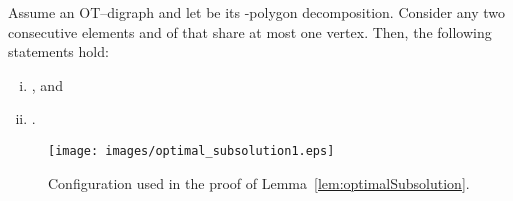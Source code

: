 \documentclass{myllncs-mixalis}
\begin{document}
\begin{lemma}
\label{lem:optimalSubsolution} Assume an OT--digraph  and let
 be its -polygon
decomposition. Consider any two consecutive elements  and
 of   that   share at most one vertex.
Then, the following statements hold:\vspace*{-.5cm}
\begin{enumerate}[(i)]
\item ,  and
\item .
\end{enumerate}
\end{lemma}

\begin{figure}[htb]
    \centering
    \texttt{[image: images/optimal\_subsolution1.eps]}
    \caption{Configuration used in the proof of Lemma~\ref{lem:optimalSubsolution}.}
    \label{fig:optimalSubsolution}
\end{figure}
\end{document}

